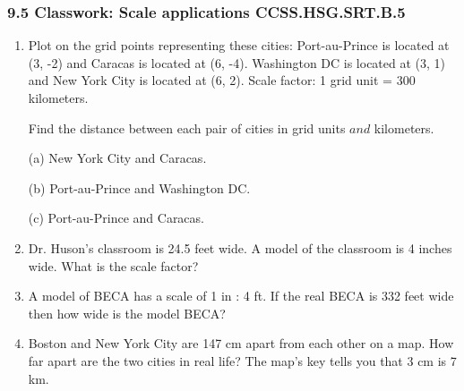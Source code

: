 

\fancyhead[LE]{\thepage}



\subsubsection*{9.5 Classwork: Scale applications \hfill CCSS.HSG.SRT.B.5}
\begin{enumerate}

\item Plot on the grid points representing these cities: Port-au-Prince is located at (3, -2) and Caracas is located at (6, -4). Washington DC is located at (3, 1) and New York City is located at (6, 2). Scale factor: 1 grid unit = 300 kilometers.

Find the distance between each pair of cities in grid units $and$ kilometers.

(a) New York City and Caracas.

(b) Port-au-Prince and Washington DC.

(c) Port-au-Prince and Caracas.

\begin{multicols}{2}
\end{multicols}

\item Dr. Huson's classroom is 24.5 feet wide. A model of the classroom is 4 inches wide. What is the scale factor?\vspace{2cm}

\item A model of BECA has a scale of 1 in : 4 ft. If the real BECA is 332 feet wide then how wide is the model BECA?\vspace{2cm}

\item Boston and New York City are 147 cm apart from each other on a map. How far apart are the two cities in real life? The map's key tells you that 3 cm is 7 km.


\end{enumerate}
